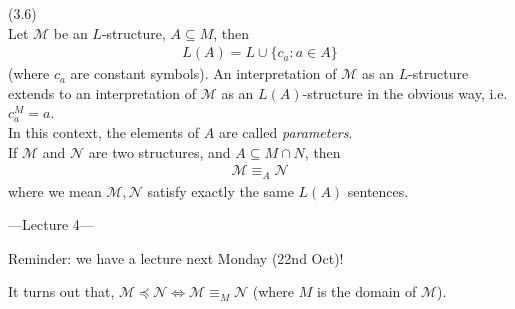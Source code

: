 \documentclass[a4paper]{article}
\begin{document}
\begin{defi} (3.6)\\
    Let $\mathcal{M}$ be an $L$-structure, $A \subseteq M$, then
    \begin{equation*}
        \begin{aligned}
            L(A) = L \cup \{c_a:a \in A\}
        \end{aligned}
    \end{equation*}
    (where $c_a$ are constant symbols). An interpretation of $\mathcal{M}$ as an $L$-structure extends to an interpretation of $\mathcal{M}$ as an $L(A)$-structure in the obvious way, i.e. $c_a^M = a$.\\
    In this context, the elements of $A$ are called \emph{parameters}.\\
    If $\mathcal{M}$ and $\mathcal{N}$ are two structures, and $A \subseteq M \cap N$, then
    \begin{equation*}
        \begin{aligned}
            \mathcal{M} \equiv_A \mathcal{N}
        \end{aligned}
    \end{equation*}
    where we mean $\mathcal{M},\mathcal{N}$ satisfy exactly the same $L(A)$ sentences.
\end{defi}

---Lecture 4---

Reminder: we have a lecture next Monday (22nd Oct)!

\begin{prop}
    It turns out that, $\mathcal{M} \preccurlyeq \mathcal{N} \iff \mathcal{M} \equiv_M \mathcal{N}$ (where $M$ is the domain of $\mathcal{M}$).
\end{prop}
\end{document}
